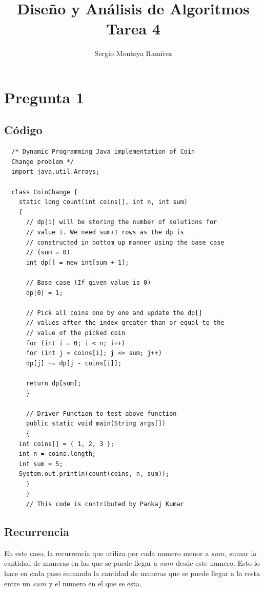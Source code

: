 \documentclass{report}
\title{\Huge{Diseño y Análisis de Algoritmos}\\Tarea 4}
\author{\huge{Sergio Montoya Ramírez}}
\date{}
\begin{document}
\maketitle
\newpage%
\tableofcontents
\pagebreak

\chapter{Pregunta 1}

\section{Código}
\begin{verbatim}
  /* Dynamic Programming Java implementation of Coin
  Change problem */
  import java.util.Arrays;

  class CoinChange {
    static long count(int coins[], int n, int sum)
    {
      // dp[i] will be storing the number of solutions for
      // value i. We need sum+1 rows as the dp is
      // constructed in bottom up manner using the base case
      // (sum = 0)
      int dp[] = new int[sum + 1];

      // Base case (If given value is 0)
      dp[0] = 1;

      // Pick all coins one by one and update the dp[]
      // values after the index greater than or equal to the
      // value of the picked coin
      for (int i = 0; i < n; i++)
      for (int j = coins[i]; j <= sum; j++)
      dp[j] += dp[j - coins[i]];

      return dp[sum];
      }

      // Driver Function to test above function
      public static void main(String args[])
      {
	int coins[] = { 1, 2, 3 };
	int n = coins.length;
	int sum = 5;
	System.out.println(count(coins, n, sum));
      }
      }
      // This code is contributed by Pankaj Kumar
\end{verbatim}

\section{Recurrencia}

En este caso, la recurrencia que utiliza por cada numero menor a $sum$, sumar la cantidad de maneras en las que se puede llegar a $sum$ desde este numero. Esto lo hace en cada paso sumando la cantidad de maneras que se puede llegar a la resta entre un $sum$ y el numero en el que se esta.
\end{document}
